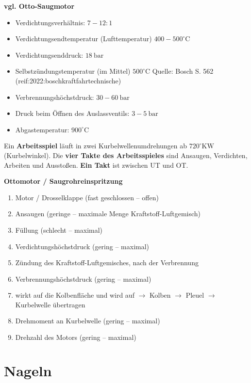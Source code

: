 \textbf{vgl. Otto-Saugmotor}

\begin{itemize}
\item
  Verdichtungsverhältnis: $7-12:1$
\item
  Verdichtungsendtemperatur (Lufttemperatur) $400 - 500^\circ\text{C}$
\item
  Verdichtungsenddruck: $18~\text{bar}$
\item
  Selbstzündungstemperatur (im Mittel) $500^\circ\text{C}$ Quelle:
  Bosch S. 562 (\textcite{}reif:2022:boschkraftfahrtechnische)
\item
  Verbrennungshöchstdruck: $30 - 60~\text{bar}$
\item
  Druck beim Öffnen des Auslassventils: $3 - 5~\text{bar}$
\item
  Abgastemperatur: $900^\circ\text{C}$
\end{itemize}

Ein \textbf{Arbeitsspiel} läuft in zwei Kurbelwellenumdrehungen ab
$720^\circ\text{KW}$ (Kurbelwinkel). Die \textbf{vier Takte des
Arbeitsspieles} sind Ansaugen, Verdichten, Arbeiten und Ausstoßen.
\textbf{Ein Takt} ist zwischen UT und OT.

\textbf{Ottomotor / Saugrohreinspritzung}

\begin{enumerate}
\item
  Motor / Drosselklappe (fast geschlossen -- offen)
\item
  Ansaugen (geringe -- maximale Menge Kraftstoff-Luftgemisch)
\item
  Füllung (schlecht -- maximal)
\item
  Verdichtungshöchstdruck (gering -- maximal)
\item
  Zündung des Kraftstoff-Luftgemisches, nach der Verbrennung
\item
  Verbrennungshöchstdruck (gering -- maximal)
\item
  wirkt auf die Kolbenfläche und wird auf $\to$ Kolben $\to$ Pleuel
  $\to$ Kurbelwelle übertragen
\item
  Drehmoment an Kurbelwelle (gering -- maximal)
\item
  Drehzahl des Motors (gering -- maximal)
\end{enumerate}

\section{Nageln}\label{nageln}

